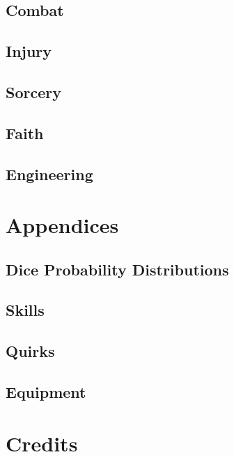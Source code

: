 \documentclass[12pt, oneside]{book}
\begin{document}
    \chapter{Combat}

    \chapter{Injury}

    \chapter{Sorcery}

    \chapter{Faith}

    \chapter{Engineering}


    \part{Appendices}
    \begin{appendices}
        \chapter{Dice Probability Distributions}

        \chapter{Skills}

        \chapter{Quirks}

        \chapter{Equipment}

    \end{appendices}

    \part{Credits}
    
\end{document}
